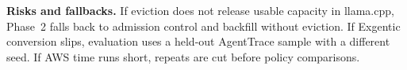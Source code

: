 \documentclass[10pt,twocolumn,letterpaper]{article}
\begin{document}
\noindent\textbf{Risks and fallbacks.} If eviction does not release usable capacity in llama.cpp, Phase~2 falls back to admission control and backfill without eviction. If Exgentic conversion slips, evaluation uses a held-out AgentTrace sample with a different seed. If AWS time runs short, repeats are cut before policy comparisons.
\end{document}
